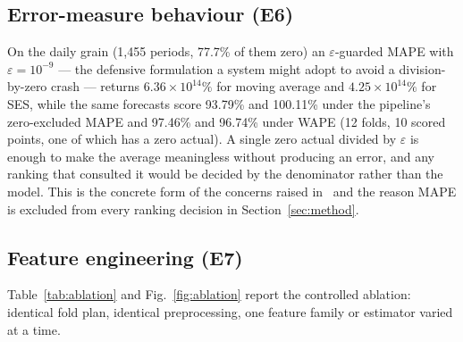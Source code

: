\documentclass[conference]{IEEEtran}
\begin{document}
\subsection{Error-measure behaviour (E6)}

On the daily grain (1{,}455 periods, 77.7\% of them zero) an
$\varepsilon$-guarded MAPE with $\varepsilon=10^{-9}$ --- the defensive
formulation a system might adopt to avoid a division-by-zero crash --- returns
$6.36\times10^{14}\%$ for moving average and $4.25\times10^{14}\%$ for SES,
while the same forecasts score 93.79\% and 100.11\% under the pipeline's
zero-excluded MAPE and 97.46\% and 96.74\% under WAPE (12 folds, 10 scored
points, one of which has a zero actual). A single zero actual
divided by $\varepsilon$ is enough to make the average meaningless without
producing an error, and any ranking that consulted it would be decided by the
denominator rather than the model. This is the concrete form of the concerns
raised in~\cite{hyndman2006accuracy,davydenko2013measuring,kolassa2020bestpoint}
and the reason MAPE is excluded from every ranking decision in
Section~\ref{sec:method}.

\subsection{Feature engineering (E7)}

Table~\ref{tab:ablation} and Fig.~\ref{fig:ablation} report the controlled
ablation: identical fold plan, identical preprocessing, one feature family or
estimator varied at a time.
\end{document}

